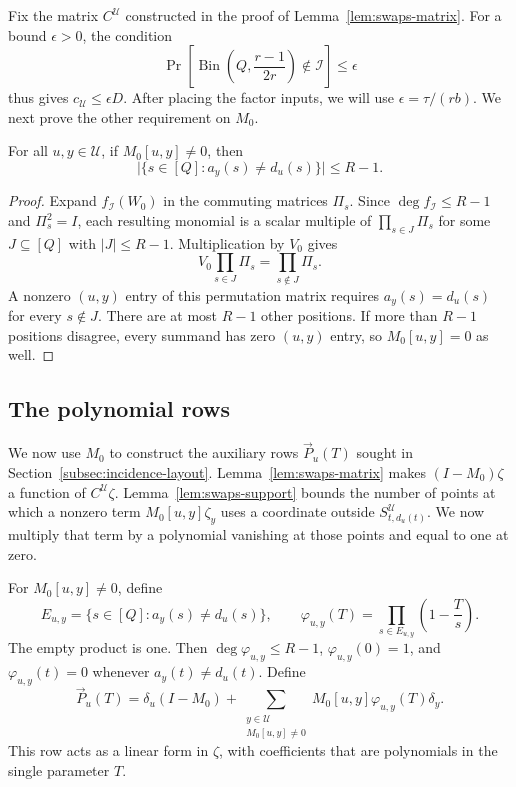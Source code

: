 Fix the matrix $C^{\mathcal U}$ constructed in the proof of
Lemma~\ref{lem:swaps-matrix}. For a bound $\epsilon>0$, the condition
\begin{equation}\label{eq:incidence-tail}
 \Pr\!\left[\operatorname{Bin}\!\left(Q,\frac{r-1}{2r}\right)
                         \notin\mathcal I\right]\le\epsilon
\end{equation}
thus gives $c_{\mathcal U}\le\epsilon D$. After placing the factor
inputs, we will use $\epsilon=\tau/(rb)$. We next prove the other
requirement on $M_0$.

\begin{lemma}\label{lem:swaps-support}
For all $u,y\in\mathcal U$, if $M_0[u,y]\ne0$, then
\[
 \bigl|\{s\in[Q]:a_y(s)\ne d_u(s)\}\bigr|\le R-1.
\]
\end{lemma}
\begin{proof}
Expand $f_{\mathcal I}(W_0)$ in the commuting matrices $\Pi_s$.
Since $\deg f_{\mathcal I}\le R-1$ and $\Pi_s^2=I$, each resulting
monomial is a scalar multiple of $\prod_{s\in J}\Pi_s$ for some
$J\subseteq[Q]$ with $|J|\le R-1$. Multiplication by $V_0$ gives
\[
 V_0\prod_{s\in J}\Pi_s=\prod_{s\notin J}\Pi_s.
\]
A nonzero $(u,y)$ entry of this permutation matrix requires
$a_y(s)=d_u(s)$ for every $s\notin J$. There are at most $R-1$
other positions. If more than $R-1$ positions disagree, every
summand has zero $(u,y)$ entry, so $M_0[u,y]=0$ as well.
\end{proof}

\subsection{The polynomial rows}
We now use $M_0$ to construct the auxiliary rows $\vec{P}_u(T)$ sought
in Section~\ref{subsec:incidence-layout}.
Lemma~\ref{lem:swaps-matrix} makes $(I-M_0)\zeta$ a function of
$C^{\mathcal U}\zeta$. Lemma~\ref{lem:swaps-support} bounds the number
of points at which a nonzero term $M_0[u,y]\zeta_y$ uses a coordinate
outside $S^{\mathcal U}_{t,d_u(t)}$. We now multiply that term by a
polynomial vanishing at those points and equal to one at zero.

For $M_0[u,y]\ne0$, define
\begin{equation}\label{eq:coefficient-correction}
 E_{u,y}=\{s\in[Q]:a_y(s)\ne d_u(s)\},\qquad
 \varphi_{u,y}(T)=\prod_{s\in E_{u,y}}\left(1-\frac Ts\right).
\end{equation}
The empty product is one. Then $\deg\varphi_{u,y}\le R-1$,
$\varphi_{u,y}(0)=1$, and $\varphi_{u,y}(t)=0$ whenever
$a_y(t)\ne d_u(t)$. Define
\begin{equation}\label{eq:swaps-row}
 \vec{P}_u(T)=\delta_u(I-M_0)+
 \sum_{\substack{y\in\mathcal U\\M_0[u,y]\ne0}}
 M_0[u,y]\varphi_{u,y}(T)\delta_y.
\end{equation}
This row acts as a linear form in $\zeta$, with coefficients that are
polynomials in the single parameter $T$.

